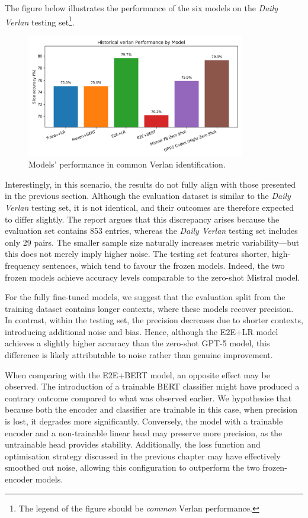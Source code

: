 \documentclass[12pt]{article}
\begin{document}
The figure below illustrates the performance of the six models on the \textit{Daily Verlan} testing set\footnote{The legend of the figure should be \textit{common} Verlan performance.}.

\begin{figure}[H]
    \centering
    \includegraphics[width=0.85\textwidth]{figures/historical_verlan_comparison.png}
    \caption{Models' performance in common Verlan identification.}
    \label{fig:historical-verlan-comparison}
\end{figure}

Interestingly, in this scenario, the results do not fully align with those presented in the previous section. 
Although the evaluation dataset is similar to the \textit{Daily Verlan} testing set, it is not identical, and their outcomes are therefore expected to differ slightly. 
The report argues that this discrepancy arises because the evaluation set contains 853 entries, whereas the \textit{Daily Verlan} testing set includes only 29 pairs. 
The smaller sample size naturally increases metric variability\;---\;but this does not merely imply higher noise. 
The testing set features shorter, high-frequency sentences, which tend to favour the frozen models. 
Indeed, the two frozen models achieve accuracy levels comparable to the zero-shot Mistral model.

For the fully fine-tuned models, we suggest that the evaluation split from the training dataset contains longer contexts, where these models recover precision. 
In contrast, within the testing set, the precision decreases due to shorter contexts, introducing additional noise and bias. 
Hence, although the E2E+LR model achieves a slightly higher accuracy than the zero-shot GPT-5 model, this difference is likely attributable to noise rather than genuine improvement.

When comparing with the E2E+BERT model, an opposite effect may be observed. 
The introduction of a trainable BERT classifier might have produced a contrary outcome compared to what was observed earlier. 
We hypothesise that because both the encoder and classifier are trainable in this case, when precision is lost, it degrades more significantly. 
Conversely, the model with a trainable encoder and a non-trainable linear head may preserve more precision, as the untrainable head provides stability. 
Additionally, the loss function and optimisation strategy discussed in the previous chapter may have effectively smoothed out noise, allowing this configuration to outperform the two frozen-encoder models.
\end{document}
